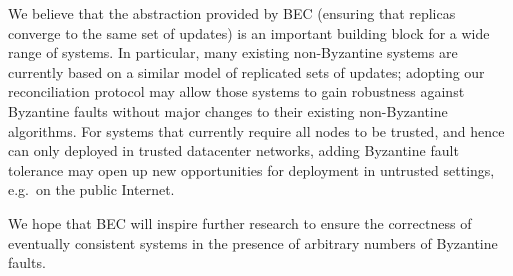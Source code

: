 \documentclass[a4paper,anonymous,USenglish]{lipics-v2019}
\begin{document}
We believe that the abstraction provided by BEC (ensuring that replicas converge to the same set of updates) is an important building block for a wide range of systems.
In particular, many existing non-Byzantine systems are currently based on a similar model of replicated sets of updates; adopting our reconciliation protocol may allow those systems to gain robustness against Byzantine faults without major changes to their existing non-Byzantine algorithms.
For systems that currently require all nodes to be trusted, and hence can only deployed in trusted datacenter networks, adding Byzantine fault tolerance may open up new opportunities for deployment in untrusted settings, e.g.\ on the public Internet.

We hope that BEC will inspire further research to ensure the correctness of eventually consistent systems in the presence of arbitrary numbers of Byzantine faults.



\end{document}
